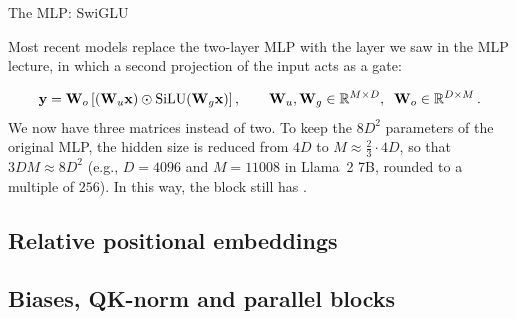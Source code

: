 \documentclass[11pt,aspectratio=169]{beamer}
\begin{document}
\begin{frame}{The MLP: SwiGLU}
    \setlength{\parskip}{5pt}

    Most recent models replace the two-layer MLP with the 
    layer we saw in the MLP lecture, in which a second projection of the
    input acts as a gate:

    \begin{center}
        
    \end{center}
    \vspace{-0.8em}
    \[
        \boldsymbol{\mathbf{y}}=\boldsymbol{\mathbf{W}}_o\left[(\boldsymbol{\mathbf{W}}_u\boldsymbol{\mathbf{x}})\odot\operatorname{SiLU}(\boldsymbol{\mathbf{W}}_g\boldsymbol{\mathbf{x}})\right] ,
        \qquad \boldsymbol{\mathbf{W}}_u,\boldsymbol{\mathbf{W}}_g\in\mathbb{R}^{M\times D},\;\;
        \boldsymbol{\mathbf{W}}_o\in\mathbb{R}^{D\times M} \,.
    \]
    We now have three matrices instead of two. To keep the $8D^2$ parameters
    of the original MLP, the hidden size is reduced from $4D$ to
    $M\approx\tfrac{2}{3}\cdot 4D$, so that $3DM\approx 8D^2$ (e.g., $D=4096$
    and $M=11008$ in Llama~2 7B, rounded to a multiple of $256$). In this
    way, the block still has .


\end{frame}

\subsection{Relative positional embeddings}



\subsection{Biases, QK-norm and parallel blocks}
\end{document}
